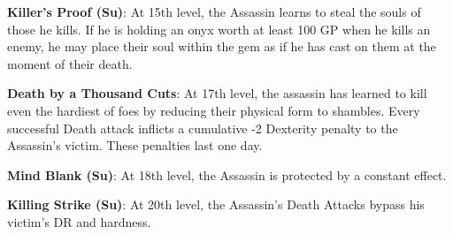 \textbf{Killer's Proof (Su)}: At 15th level, the Assassin learns to steal the souls of those he kills. If he is holding an onyx worth at least 100 GP when he kills an enemy, he may place their soul within the gem as if he has cast  on them at the moment of their death.

\textbf{Death by a Thousand Cuts}: At 17th level, the assassin has learned to kill even the hardiest of foes by reducing their physical form to shambles. Every successful Death attack inflicts a cumulative -2 Dexterity penalty to the Assassin's victim. These penalties last one day.

\textbf{Mind Blank (Su)}: At 18th level, the Assassin is protected by a constant  effect.


\textbf{Killing Strike (Su)}: At 20th level, the Assassin's Death Attacks bypass his victim's DR and hardness.
